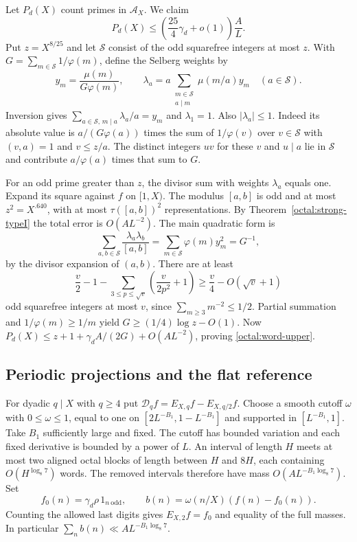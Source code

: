 \documentclass[11pt,a4paper]{article}
\theoremstyle{paperplain}
\numberwithin{equation}{section}
\begin{document}
Let $P_d(X)$ count primes in $\mathcal A_X$. We claim
\begin{equation}\label{octal:word-upper}
 P_d(X)\le \left(\frac{25}{4}\gamma_d+o(1)\right)\frac A L.
\end{equation}
Put $z=X^{8/25}$ and let $\mathcal S$ consist of the odd squarefree
integers at most $z$. With $G=\sum_{m\in\mathcal S}1/\varphi(m)$,
define the Selberg weights by
\[
 y_m=\frac{\mu(m)}{G\varphi(m)},\qquad
 \lambda_a=a\sum_{\substack{m\in\mathcal S\\a\mid m}}\mu(m/a)y_m
 \quad (a\in\mathcal S).
\]
Inversion gives $\sum_{a\in\mathcal S,\,m\mid a}\lambda_a/a=y_m$
and $\lambda_1=1$. Also $|\lambda_a|\le1$. Indeed its absolute value
is $a/(G\varphi(a))$ times the sum of $1/\varphi(v)$ over
$v\in\mathcal S$ with $(v,a)=1$ and $v\le z/a$. The distinct integers
$uv$ for these $v$ and $u\mid a$ lie in $\mathcal S$ and contribute
$a/\varphi(a)$ times that sum to $G$.

For an odd prime greater than $z$, the divisor sum with weights
$\lambda_a$ equals one. Expand its square against $f$ on $[1,X)$.
The modulus $[a,b]$ is odd and at most $z^2=X^{.640}$, with at most
$\tau([a,b])^2$ representations. By Theorem~\ref{octal:strong-typeI}
the total error is $O(AL^{-2})$. The main quadratic form is
\[
 \sum_{a,b\in\mathcal S}\frac{\lambda_a\lambda_b}{[a,b]}
       =\sum_{m\in\mathcal S}\varphi(m)y_m^2=G^{-1},
\]
by the divisor expansion of $(a,b)$. There are at least
\[
 \frac v2-1-\sum_{3\le p\le\sqrt v}\left(\frac{v}{2p^2}+1\right)
       \ge\frac v4-O(\sqrt v+1)
\]
odd squarefree integers at most $v$, since
$\sum_{m\ge3}m^{-2}\le1/2$. Partial summation and
$1/\varphi(m)\ge1/m$ yield $G\ge(1/4)\log z-O(1)$.
Now $P_d(X)\le z+1+\gamma_d A/(2G)+O(AL^{-2})$, proving
\eqref{octal:word-upper}.

\subsection{Periodic projections and the flat reference}
\label{sec:vaughan-signed}

For dyadic $q\mid X$ with $q\ge4$ put
$\mathcal D_q f=E_{X,q}f-E_{X,q/2}f$. Choose a smooth cutoff $\omega$
with $0\le\omega\le1$, equal to one on $[2L^{-B_1},1-L^{-B_1}]$
and supported in $[L^{-B_1},1]$. Take $B_1$ sufficiently large and
fixed. The cutoff has bounded variation and each fixed derivative
is bounded by a power of $L$. An interval of length $H$ meets at
most two aligned octal blocks of length between $H$ and $8H$, each
containing $O(H^{\log_8 7})$ words. The removed intervals therefore
have mass $O(AL^{-B_1\log_8 7})$.
Set
\[
 f_0(n)=\gamma_d\rho\,1_{n\ \mathrm{odd}},\qquad
 b(n)=\omega(n/X)(f(n)-f_0(n)).
\]
Counting the allowed last digits gives $E_{X,2}f=f_0$ and equality
of the full masses. In particular $\sum_n b(n)\ll AL^{-B_1\log_8 7}$.
\end{document}
